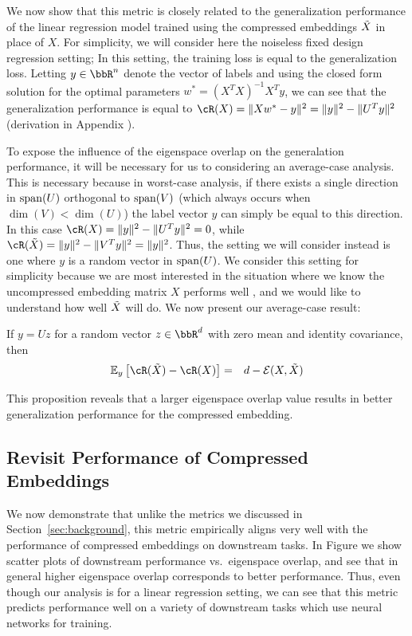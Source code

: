 We now show that this metric is closely related to the generalization performance of the linear regression model trained using the compressed embeddings $\tX$ in place of $X$.
For simplicity, we will consider here the noiseless fixed design regression setting;
In this setting, the training loss is equal to the generalization loss.
Letting $y\in\RR^n$ denote the vector of labels and using the closed form solution for the optimal parameters $w^* = (X^T X)^{-1}X^Ty$, we can see that the generalization performance is equal to $\cR(X) = \|Xw^* - y\|^2 = \|y\|^2 - \|U^T y\|^2$ (derivation in Appendix ).

To expose the influence of the eigenspace overlap on the generalation performance, it will be necessary for us to considering an average-case analysis.
This is necessary because in worst-case analysis, if there exists a single direction in $\Span(U)$ orthogonal to $\Span(V)$ (which always occurs when $\dim(V) < \dim(U)$) the label vector $y$ can simply be equal to this direction.
In this case $\cR(X) = \|y\|^2 - \|U^T y\|^2 = 0$, while $\cR(\tX) = \|y\|^2 - \|V^T y\|^2 = \|y\|^2$.
Thus, the setting we will consider instead is one where $y$ is a random vector in $\Span(U)$.
We consider this setting for simplicity because we are most interested in the situation where we know the uncompressed embedding matrix $X$ performs well , and we would like to understand how well $\tX$ will do.
We now present our average-case result:

\begin{proposition}
If $y = Uz$ for a random vector $z \in \RR^d$ with zero mean and identity covariance, then
\begin{eqnarray}
\expect{y}{\cR(\tX) - \cR(X)} &=& d - \eigover(X,\tX)
\end{eqnarray}
\end{proposition}

This proposition reveals that a larger eigenspace overlap value results in better generalization performance for the compressed embedding.

\subsection{Revisit Performance of Compressed Embeddings}
\label{subsec:revisit}
We now demonstrate that unlike the metrics we discussed in Section~\ref{sec:background}, this metric empirically aligns very well with the performance of compressed embeddings on downstream tasks.
In Figure  we show scatter plots of downstream performance vs.\ eigenspace overlap, and see that in general higher eigenspace overlap corresponds to better performance.
Thus, even though our analysis is for a linear regression setting, we can see that this metric predicts performance well on a variety of downstream tasks which use neural networks for training.


